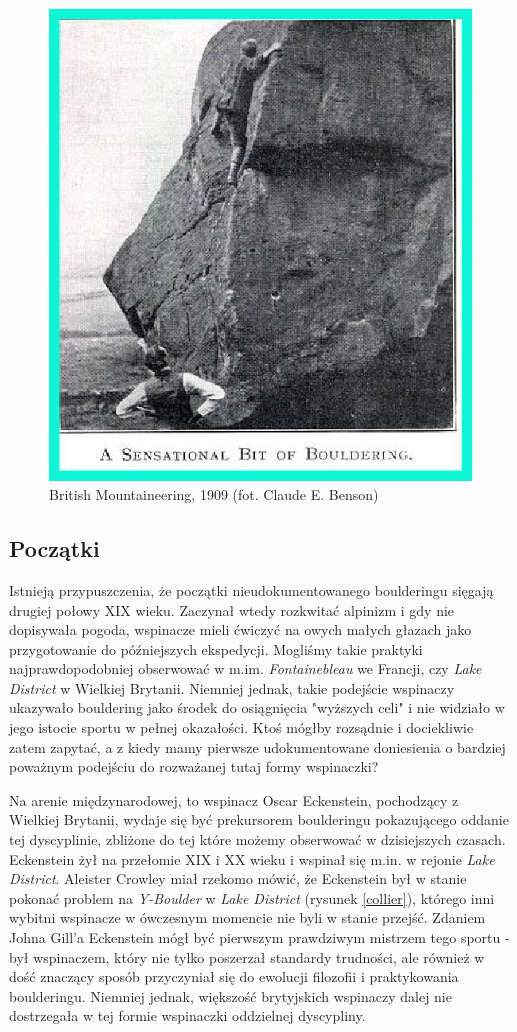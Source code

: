 \documentclass{article}
\begin{document}
\begin{figure}[!htbp]
	\begin{center}
		\includegraphics[width=0.5\linewidth]{images/old1.eps}
	\end{center}
	\caption{British Mountaineering, 1909 (fot. Claude E. Benson) \cite{gill-history}}
	\label{benson}
\end{figure}

\subsection{Początki}
Istnieją przypuszczenia, że początki nieudokumentowanego boulderingu sięgają drugiej połowy XIX wieku. Zaczynał wtedy rozkwitać alpinizm i gdy nie dopisywała pogoda, wspinacze mieli ćwiczyć na owych małych głazach jako przygotowanie do późniejszych ekspedycji. Mogliśmy takie praktyki najprawdopodobniej obserwować w m.im. \textit{Fontainebleau} we Francji, czy \textit{Lake District} w Wielkiej Brytanii. Niemniej jednak, takie podejście wspinaczy ukazywało bouldering jako środek do osiągnięcia "wyższych celi" i nie widziało w jego istocie sportu w pełnej okazałości. Ktoś mógłby rozsądnie i dociekliwie zatem zapytać, a z kiedy mamy pierwsze udokumentowane doniesienia o bardziej poważnym podejściu do rozważanej tutaj formy wspinaczki?

Na arenie międzynarodowej, to wspinacz Oscar Eckenstein, pochodzący z Wielkiej Brytanii, wydaje się być prekursorem boulderingu pokazującego oddanie tej dyscyplinie, zbliżone do tej które możemy obserwować w dzisiejszych czasach. Eckenstein żył na przełomie XIX i XX wieku i wspinał się m.in. w rejonie \textit{Lake District}. Aleister Crowley miał rzekomo mówić, że Eckenstein był w stanie pokonać problem na \textit{Y-Boulder} w \textit{Lake District} (rysunek \ref{collier}), którego inni wybitni wspinacze w ówczesnym momencie nie byli w stanie przejść. Zdaniem Johna Gill'a Eckenstein mógł być pierwszym prawdziwym mistrzem tego sportu - był wspinaczem, który nie tylko poszerzał standardy trudności, ale również w dość znaczący sposób przyczyniał się do ewolucji filozofii i praktykowania boulderingu. Niemniej jednak, większość brytyjskich wspinaczy dalej nie dostrzegała w tej formie wspinaczki oddzielnej dyscypliny.
\end{document}
